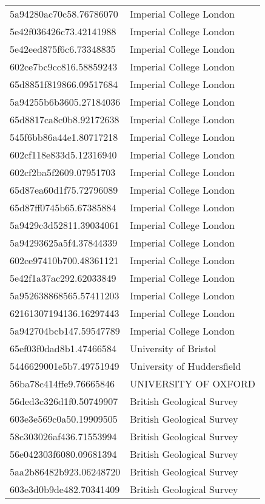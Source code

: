 \begin{tabular}{ll}
5a94280ac70c58.76786070 & Imperial College London \\
5e42f036426c73.42141988 & Imperial College London \\
5e42eed875f6c6.73348835 & Imperial College London \\
602ce7bc9cc816.58859243 & Imperial College London \\
65d8851f819866.09517684 & Imperial College London \\
5a94255b6b3605.27184036 & Imperial College London \\
65d8817ca8c0b8.92172638 & Imperial College London \\
545f6bb86a44e1.80717218 & Imperial College London \\
602cf118e833d5.12316940 & Imperial College London \\
602cf2ba5f2609.07951703 & Imperial College London \\
65d87ea60d1f75.72796089 & Imperial College London \\
65d87ff0745b65.67385884 & Imperial College London \\
5a9429c3d52811.39034061 & Imperial College London \\
5a94293625a5f4.37844339 & Imperial College London \\
602ce97410b700.48361121 & Imperial College London \\
5e42f1a37ac292.62033849 & Imperial College London \\
5a952638868565.57411203 & Imperial College London \\
62161307194136.16297443 & Imperial College London \\
5a942704bcb147.59547789 & Imperial College London \\
65ef03f0dad8b1.47466584 & University of Bristol \\
5446629001e5b7.49751949 & University of Huddersfield \\
56ba78c414ffe9.76665846 & UNIVERSITY OF OXFORD \\
56ded3c326d1f0.50749907 & British Geological Survey \\
603e3e569c0a50.19909505 & British Geological Survey \\
58c303026af436.71553994 & British Geological Survey \\
56e042303f6080.09681394 & British Geological Survey \\
5aa2b86482b923.06248720 & British Geological Survey \\
603e3d0b9de482.70341409 & British Geological Survey \\

\end{tabular}
